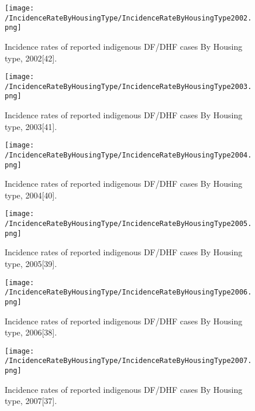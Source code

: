 \documentclass[11pt]{exam}
\begin{document}
\begin{questions}
\begin{enumerate}
\begin{figure}[H]
  \centering
   \texttt{[image: /IncidenceRateByHousingType/IncidenceRateByHousingType2002.png]} 
  \caption{Incidence rates of reported indigenous DF/DHF cases By Housing type, 2002[42].}
   \label{Incidence rate of indigenous DF/DHF cases by housing type.}
\end{figure} 

\begin{figure}[H]
  \centering
   \texttt{[image: /IncidenceRateByHousingType/IncidenceRateByHousingType2003.png]} 
  \caption{Incidence rates of reported indigenous DF/DHF cases By Housing type, 2003[41].}
   \label{Incidence rate of indigenous DF/DHF cases by housing type.}
\end{figure} 

\begin{figure}[H]
  \centering
   \texttt{[image: /IncidenceRateByHousingType/IncidenceRateByHousingType2004.png]} 
  \caption{Incidence rates of reported indigenous DF/DHF cases By Housing type, 2004[40].}
   \label{Incidence rate of indigenous DF/DHF cases by housing type.}
\end{figure} 

\begin{figure}[H]
  \centering
   \texttt{[image: /IncidenceRateByHousingType/IncidenceRateByHousingType2005.png]} 
  \caption{Incidence rates of reported indigenous DF/DHF cases By Housing type, 2005[39].}
   \label{Incidence rate of indigenous DF/DHF cases by housing type.}
\end{figure} 

\begin{figure}[H]
  \centering
   \texttt{[image: /IncidenceRateByHousingType/IncidenceRateByHousingType2006.png]} 
  \caption{Incidence rates of reported indigenous DF/DHF cases By Housing type, 2006[38].}
   \label{Incidence rate of indigenous DF/DHF cases by housing type.}
\end{figure} 

\begin{figure}[H]
  \centering
   \texttt{[image: /IncidenceRateByHousingType/IncidenceRateByHousingType2007.png]} 
  \caption{Incidence rates of reported indigenous DF/DHF cases By Housing type, 2007[37].}
   \label{Incidence rate of indigenous DF/DHF cases by housing type.}
\end{figure} 


\end{enumerate}
\end{questions}
\end{document}
